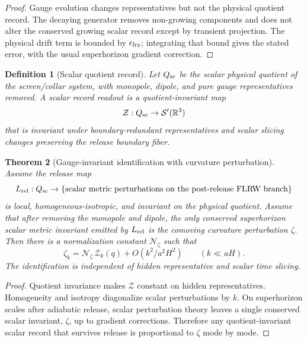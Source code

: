 \documentclass[11pt]{article}
\newtheorem{theorem}{Theorem}[section]
\newtheorem{definition}[theorem]{Definition}
\begin{document}
\begin{proof}
Gauge evolution changes representatives but not the physical quotient record. The decaying generator
removes non-growing components and does not alter the conserved growing scalar record except by
transient projection. The physical drift term is bounded by \(\epsilon_{\rm frz}\); integrating
that bound gives the stated error, with the usual superhorizon gradient correction.
\end{proof}

\begin{definition}[Scalar quotient record]\label{def:scalar-quotient-record}
Let \(Q_{\rm sc}\) be the scalar physical quotient of the screen/collar system, with monopole,
dipole, and pure gauge representatives removed. A scalar record readout is a quotient-invariant map
\[
\mathcal Z:Q_{\rm sc}\to\mathcal S'(\mathbb R^3)
\]
that is invariant under boundary-redundant representatives and scalar slicing changes preserving the
release boundary fiber.
\end{definition}

\begin{theorem}[Gauge-invariant identification with curvature perturbation]\label{thm:gauge-zeta}
Assume the release map
\[
L_{\rm rel}:Q_{\rm sc}\to
\{\hbox{scalar metric perturbations on the post-release FLRW branch}\}
\]
is local, homogeneous-isotropic, and invariant on the physical quotient. Assume that after removing
the monopole and dipole, the only conserved superhorizon scalar metric invariant emitted by
\(L_{\rm rel}\) is the comoving curvature perturbation \(\zeta\). Then there is a normalization
constant \(\mathcal N_\zeta\) such that
\[
\zeta_k
=
\mathcal N_\zeta\,\mathcal Z_k(q)
+
O(k^2/a^2H^2)
\qquad
(k\ll aH).
\]
The identification is independent of hidden representative and scalar time slicing.
\end{theorem}

\begin{proof}
Quotient invariance makes \(\mathcal Z\) constant on hidden representatives. Homogeneity and
isotropy diagonalize scalar perturbations by \(k\). On superhorizon scales after adiabatic release,
scalar perturbation theory leaves a single conserved scalar invariant, \(\zeta\), up to gradient
corrections. Therefore any quotient-invariant scalar record that survives release is proportional to
\(\zeta\) mode by mode.
\end{proof}
\end{document}

